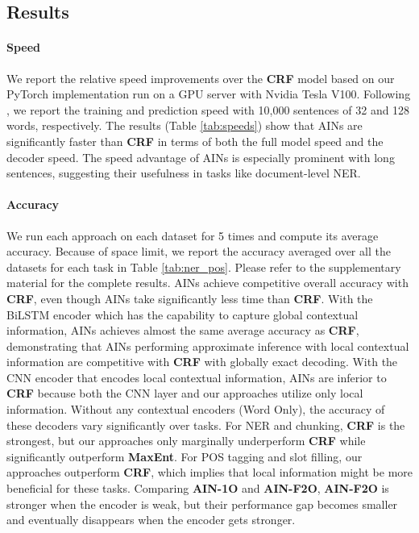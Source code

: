 \documentclass[11pt,a4paper]{article}
\begin{document}
\subsection{Results}

\paragraph{Speed}
We report the relative speed improvements over the \textbf{CRF} model based on our PyTorch \cite{NEURIPS2019_9015} implementation run on a GPU server with Nvidia Tesla V100. Following \citet{tsai-etal-2019-small}, we report the training and prediction speed with 10,000 sentences of 32 and 128 words, respectively.
The results (Table \ref{tab:speeds}) show that AINs are significantly faster than \textbf{CRF} in terms of both the full model speed and the decoder speed.
The speed advantage of AINs is especially prominent with long sentences, suggesting their usefulness in tasks like document-level NER.


\paragraph{Accuracy}
We run each approach on each dataset for 5 times and compute its average accuracy.
Because of space limit, we report the accuracy averaged over all the datasets for each task in Table \ref{tab:ner_pos}. Please refer to the supplementary material for the complete results. AINs achieve competitive overall accuracy with \textbf{CRF}, even though AINs take significantly less time than \textbf{CRF}. With the BiLSTM encoder which has the capability to capture global contextual information, AINs achieves almost the same average accuracy as \textbf{CRF}, demonstrating that AINs performing approximate inference with local contextual information are competitive with
\textbf{CRF} with globally exact decoding. With the CNN encoder that encodes local contextual information, AINs are inferior to \textbf{CRF} because both the CNN layer and our approaches utilize only local information. Without any contextual encoders (Word Only), the accuracy of these decoders vary significantly over tasks. For NER and chunking, \textbf{CRF} is the strongest, but our approaches only marginally underperform \textbf{CRF} while significantly outperform \textbf{MaxEnt}. For POS tagging and slot filling, our approaches outperform \textbf{CRF}, which implies that local information might be more beneficial for these tasks. Comparing \textbf{AIN-1O} and \textbf{AIN-F2O}, \textbf{AIN-F2O} is stronger when the encoder is weak, but their performance gap becomes smaller and eventually disappears when the encoder gets stronger.
\end{document}
